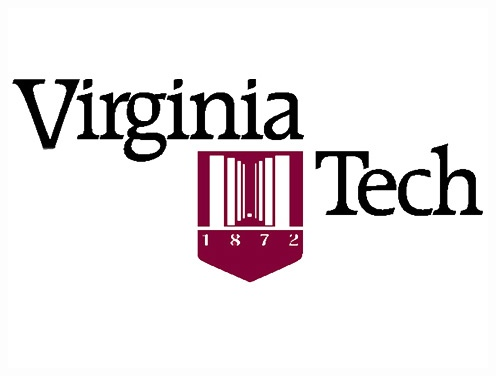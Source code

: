\begin{titlepage}
\begin{center}
	\includegraphics[scale=0.35]{Images/Logo}
\end{center}

\end{titlepage}
